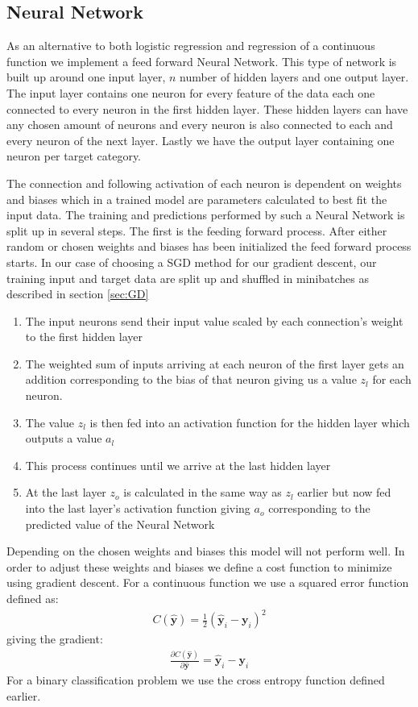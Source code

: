 \documentclass[11pt]{article}
\begin{document}
\subsection{Neural Network}
As an alternative to both logistic regression and regression of a continuous function we implement a feed forward Neural Network. This type of network is built up around one input layer, $n$ number of hidden layers and one output layer. The input layer contains one neuron for every feature of the data each one connected to every neuron in the first hidden layer. These hidden layers can have any chosen amount of neurons and every neuron is also connected to each and every neuron of the next layer. Lastly we have the output layer containing one neuron per target category.

The connection and following activation of each neuron is dependent on weights and biases which in a trained model are parameters calculated to best fit the input data. The training and predictions performed by such a Neural Network is split up in several steps. The first is the feeding forward process. After either random or chosen weights and biases has been initialized the feed forward process starts. In our case of choosing a SGD method for our gradient descent, our training input and target data are split up and shuffled in minibatches as described in section \ref{sec:GD}
\begin{enumerate}
    \item The input neurons send their input value scaled by each connection's weight to the first hidden layer
    \item The weighted sum of inputs arriving at each neuron of the first layer gets an addition corresponding to the bias of that neuron giving us a value $z_l$ for each neuron.
    \item The value $z_l$ is then fed into an activation function for the hidden layer which outputs a value $a_l$
    \item This process continues until we arrive at the last hidden layer
    \item At the last layer $z_o$ is calculated in the same way as $z_l$ earlier but now fed into the last layer's activation function giving $a_o$ corresponding to the predicted value of the Neural Network
\end{enumerate}
Depending on the chosen weights and biases this model will not perform well. In order to adjust these weights and biases we define a cost function to minimize using gradient descent. For a continuous function we use a squared error function defined as:
\begin{align*}
    C(\hat{\boldsymbol{y}}) = \frac{1}{2}(\hat{\boldsymbol{y}}_i - \boldsymbol{y}_i)^2
\end{align*}
giving the gradient:
\begin{align*}
    \frac{\partial C(\hat{\boldsymbol{y}})}{\partial  \hat{\boldsymbol{y}}} = \hat{\boldsymbol{y}}_i - \boldsymbol{y}_i
\end{align*}
For a binary classification problem we use the cross entropy function defined earlier.
\end{document}
